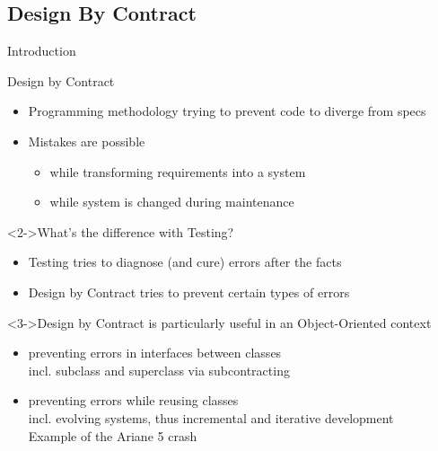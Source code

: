 \subsection{Design By Contract}
\begin{frame}{Introduction}
  \begin{block}{Design by Contract}
    \begin{itemize}
    \item Programming methodology trying to prevent code to diverge from specs
    \item Mistakes are possible
      \begin{itemize}
      \item while transforming requirements into a system
      \item while system is changed during maintenance
      \end{itemize}
    \end{itemize}
  \end{block}

  \begin{block}<2->{What's the difference with Testing?}
    \begin{itemize}
    \item Testing tries to diagnose (and cure) errors after the facts
    \item Design by Contract tries to prevent certain types of errors
    \end{itemize}
  \end{block}\vspace{-.5\baselineskip}

  \begin{block}<3->{Design by Contract is particularly useful in an Object-Oriented context}
    \begin{itemize}
    \item preventing errors in interfaces between classes\\
      {\small incl. subclass and superclass via subcontracting}
    \item preventing errors while reusing classes\\
      {\small incl. evolving systems, thus incremental and iterative
        development\\
        Example of the Ariane 5 crash} 
    \end{itemize}
  \end{block}

\end{frame}

